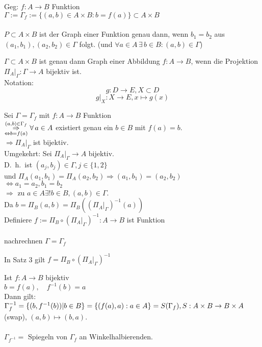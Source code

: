\documentclass[../ana1.tex]{subfiles}
\begin{document}
\begin{defi}
	Geg: \(f: A \rightarrow B\) Funktion\\
	\(\Gamma := \Gamma_f := \{(a,b) \in A\times B : b = f(a)\} \subset A\times B\) \\
	\quad
	\\
	\(P\subset A\times B\) ist der Graph einer Funktion genau dann, 
	wenn \(b_1 = b_2\) aus \((a_1,b_1), (a_2,b_2) \in \Gamma \) folgt. 
	(und \(\forall a\in A \,\exists \, b\in B:(a,b)\in\Gamma \))
\end{defi}
\begin{satz}
	\(\Gamma \subset A\times B\) ist genau dann Graph einer Abbildung 
	\(f: A\rightarrow B\), wenn die Projektion \(\Pi_A \vert_\Gamma : 
	\Gamma \rightarrow A\) bijektiv ist.\\
	Notation:\\
	\[ g: D \rightarrow E, X\subset D \]
	\[ g\vert_X: X\rightarrow E, x\mapsto g(x) \]
\end{satz}
\begin{bew}
	Sei \(\Gamma = \Gamma_f \) mit \(f: A\rightarrow B\) Funktion\\
	\( \overset{ (a,b)\in \Gamma_f }{\underset{ \Leftrightarrow b = f(a) }{\Rightarrow}} \forall \, a\in A\) existiert genau ein \(b\in B\) mit \(f(a) = b\).\\
	\(\Rightarrow \Pi_A \vert_\Gamma \) ist bijektiv.\\
	Umgekehrt: Sei \(\Pi_A \vert_\Gamma \rightarrow A\) bijektiv.\\
	D.\ h.\ ist \( (a_j, b_j) \in \Gamma, j \in \{1,2\} \) \\
	und \( \Pi_A(a_1, b_1) = \Pi_A(a_2, b_2) \Rightarrow (a_1, b_1) = (a_2, b_2)\) \\
	\(\Leftrightarrow a_1 = a_2, b_1 = b_2\) \\
	\(\Rightarrow \) zu \(a\in A \exists ! b\in B, (a,b) \in \Gamma \).\\
	Da \( b=\Pi_B(a,b) = \Pi_B({(\Pi_A\vert_\Gamma)}^{-1}(a)) \) \\
	Definiere \(f:= \Pi_B \circ {(\Pi_A\vert_\Gamma)}^{-1}:A\rightarrow B\) ist Funktion\\
	\\
	nachrechnen \( \Gamma = \Gamma_f \)
\end{bew}
\begin{bem}
	In Satz 3 gilt \(f = \Pi_B \circ {(\Pi_A\vert_\Gamma)}^{-1} \) %
\end{bem}
\begin{bsp}
	Ist \(f: A\rightarrow B\) bijektiv\\
	\(b=f(a),\quad f^{-1}(b)=a\) \\
	Dann gilt: \(\Gamma_f^{-1} = \{(b, f^{-1}(b)) | b\in B\} \\
	= \{(f(a),a):a\in A\} = S(\Gamma_f), S: A\times B \rightarrow B\times A\) (swap), \( (a,b)\mapsto(b,a) \).\\
	 \quad
	\\
	\(\Gamma_{f^{-1}} = \) Spiegeln von \( \Gamma_f \) an Winkelhalbierenden.
\end{bsp}
\end{document}
